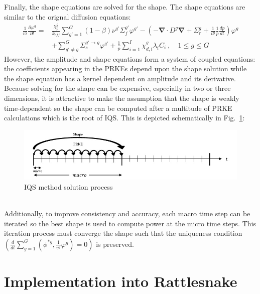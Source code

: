 \documentclass[11pt]{scrartcl}
\renewcommand{\div}{\bs{\nabla}\! \cdot \!}
\newcommand{\grad}{\bs{\nabla}}
\newcommand{\fig}[1]{Fig.~\ref{#1}}                      %
\newcommand{\bs}[1]{\mathbf{#1}}
\newcommand{\keff}{k_\textit{eff}}
\begin{document}
Finally, the shape equations are solved for the shape. The shape equations are similar to the orignal diffusion equations:
\begin{align}
\frac{1}{v^g} \frac{\partial \varphi^g }{\partial t} =& \frac{\chi_p^g}{\keff} \sum_{g'=1}^G (1-\beta) \nu^{g'} \Sigma_f^{g'} \varphi^{g'} -  \left( -\div D^g \grad  + \Sigma_r^g + \frac{1}{v^g}\frac{1}{p}\frac{dp}{dt}\right) \varphi^g  \nonumber \\
&  + \sum_{g'\neq g}^G\Sigma_s^{g'\to g} \varphi^{g'}  + \frac{1}{p}\sum_{i=1}^I\chi_{d,i}^g\lambda_i C_i \ , \quad 1 \le g \le G 
\label{eq:shape}
\end{align}
However, the amplitude and shape equations form a system of coupled equations: the coefficients appearing in the PRKEs depend upon the shape solution while the shape equation has a kernel dependent on amplitude and its derivative.  Because solving for the shape can be expensive, especially in two or three dimensions, it is attractive to make the assumption that the shape is weakly time-dependent so the shape can be computed after a multitude of PRKE calculations which is the root of IQS.  This is depicted schematically in \fig{fig:IQS}:
%
\begin{figure}[h]
\includegraphics[width=\linewidth]{IQS_visualization.jpg}
\caption{IQS method solution process}
\label{fig:IQS}
\end{figure}
%
\\
Additionally, to improve consistency and accuracy, each macro time step can be iterated so the best shape is used to compute power at the micro time steps.  This iteration process must converge the shape such that the uniqueness condition $(\frac{d}{dt}\sum_{g=1}^G\left(\phi^{*g},\frac{1}{v^g}\varphi^g\right)=0)$ is preserved.


\section{Implementation into Rattlesnake}
\end{document}
